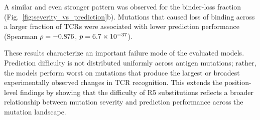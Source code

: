 \documentclass{article}
\begin{document}
A similar and even stronger pattern was observed for the binder-loss fraction
(Fig.~\ref{fig:severity_vs_prediction}b). Mutations that caused loss of
binding across a larger fraction of TCRs were associated with lower
prediction performance (Spearman $\rho=-0.876$,
$p=6.7\times10^{-37}$).

These results characterize an important failure mode of the evaluated
models. Prediction difficulty is not distributed uniformly across antigen
mutations; rather, the models perform worst on mutations that produce the
largest or broadest experimentally observed changes in TCR recognition.
This extends the position-level findings by showing that the difficulty of
R5 substitutions reflects a broader relationship between mutation severity
and prediction performance across the mutation landscape.

\end{document}
